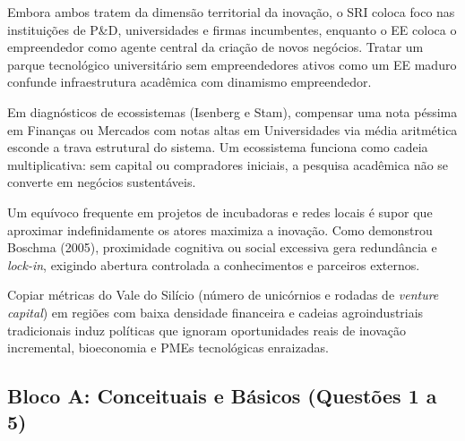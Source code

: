 
\begin{boxErro}
Embora ambos tratem da dimensão territorial da inovação, o SRI coloca foco nas instituições de P\&D, universidades e firmas incumbentes, enquanto o EE coloca o empreendedor como agente central da criação de novos negócios. Tratar um parque tecnológico universitário sem empreendedores ativos como um EE maduro confunde infraestrutura acadêmica com dinamismo empreendedor.
\end{boxErro}

\begin{boxErro}
Em diagnósticos de ecossistemas (Isenberg e Stam), compensar uma nota péssima em Finanças ou Mercados com notas altas em Universidades via média aritmética esconde a trava estrutural do sistema. Um ecossistema funciona como cadeia multiplicativa: sem capital ou compradores iniciais, a pesquisa acadêmica não se converte em negócios sustentáveis.
\end{boxErro}

\begin{boxErro}
Um equívoco frequente em projetos de incubadoras e redes locais é supor que aproximar indefinidamente os atores maximiza a inovação. Como demonstrou Boschma (2005), proximidade cognitiva ou social excessiva gera redundância e \textit{lock-in}, exigindo abertura controlada a conhecimentos e parceiros externos.
\end{boxErro}

\begin{boxErro}
Copiar métricas do Vale do Silício (número de unicórnios e rodadas de \textit{venture capital}) em regiões com baixa densidade financeira e cadeias agroindustriais tradicionais induz políticas que ignoram oportunidades reais de inovação incremental, bioeconomia e PMEs tecnológicas enraizadas.
\end{boxErro}


\subsection*{Bloco A: Conceituais e Básicos (Questões 1 a 5)}

